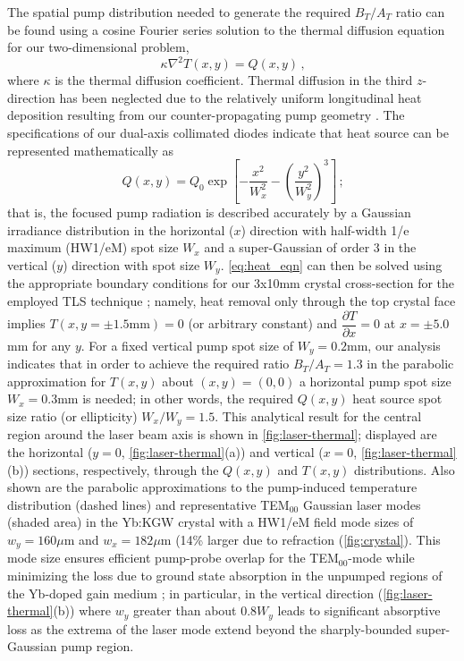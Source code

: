 The spatial pump distribution needed to generate the required $B_T/A_T$ ratio can be found using a cosine Fourier series solution to the thermal diffusion equation for our two-dimensional problem,
\begin{equation} \label{eq:heat_eqn}
  \kappa \nabla^2 T(x,y) = Q(x,y) \,\text{,}
\end{equation}
where $\kappa$ is the thermal diffusion coefficient.
Thermal diffusion in the third $z$-direction has been neglected due to the relatively uniform longitudinal heat deposition resulting from our counter-propagating pump geometry \cite{Rimington_thermal_lens_2004}.
The specifications of our dual-axis collimated diodes \cite{website_limo} indicate that heat source can be represented mathematically as
\begin{equation}
  Q(x,y) = Q_0 \exp \left[ - \frac{x^2}{W_x^2} - \left( \frac{y^2}{W_y^2} \right)^3 \right] \,\text{;}
\end{equation}
that is, the focused pump radiation is described accurately by a Gaussian irradiance distribution in the horizontal ($x$) direction with half-width 1/e maximum (HW1/eM) spot size $W_x$ and a super-Gaussian of order 3 in the vertical ($y$) direction with spot size $W_y$.
\ref{eq:heat_eqn} can then be solved using the appropriate boundary conditions for our 3x10mm crystal cross-section for the employed TLS technique \cite{Rimington_thermal_lens_2004}; namely, heat removal only through the top crystal face implies $T(x,y = \pm 1.5\text{mm}) = 0$ (or arbitrary constant) and $\dfrac{\partial T}{\partial x} = 0$ at $ x = \pm 5.0$mm for any $y$.
For a fixed vertical pump spot size of $W_y = 0.2$mm, our analysis indicates that in order to achieve the required ratio $B_T / A_T = 1.3$ in the parabolic approximation for $T(x,y)$ about $(x,y) = (0,0)$ a horizontal pump spot size $W_x = 0.3$mm is needed; in other words, the required $Q(x,y)$ heat source spot size ratio (or ellipticity) $W_x / W_y = 1.5$.
This analytical result for the central region around the laser beam axis is shown in \ref{fig:laser-thermal}; displayed are the
horizontal ($y = 0$, \ref{fig:laser-thermal}(a)) and vertical ($x = 0$, \ref{fig:laser-thermal}(b)) sections, respectively, through the $Q(x,y)$ and $T(x,y)$ distributions.
Also shown are the parabolic approximations to the pump-induced temperature distribution (dashed lines) and representative TEM$_{00}$ Gaussian laser modes (shaded area) in the Yb:KGW crystal with a HW1/eM field mode sizes of $w_y = 160\mu$m and $w_x = 182 \mu$m (14\% larger due to refraction (\ref{fig:crystal}).
This mode size ensures efficient pump-probe overlap for the TEM$_{00}$-mode while minimizing the loss due to ground state absorption in the unpumped regions of the Yb-doped gain medium \cite{Brenier_new_criteria}; in particular, in the vertical direction (\ref{fig:laser-thermal}(b)) where $w_y$ greater than about $0.8 W_y$ leads to significant absorptive loss as the extrema of the laser mode extend beyond the sharply-bounded super-Gaussian pump region.

